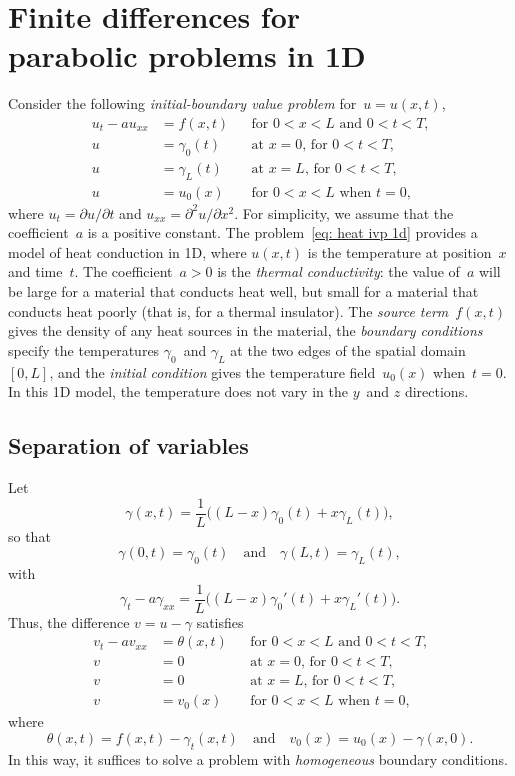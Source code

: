 \chapter[Finite differences for parabolic problems]{Finite differences for \\
parabolic problems in 1D}
Consider the following \emph{initial-boundary value problem} for~$u=u(x,t)$,
\begin{equation}\label{eq: heat ivp 1d}
\begin{aligned}
u_t-au_{xx}&=f(x,t)&&\text{for $0<x<L$ and $0<t<T$,}\\
u&=\gamma_0(t)&&\text{at $x=0$, for $0<t<T$,}\\
u&=\gamma_L(t)&&\text{at $x=L$, for $0<t<T$,}\\
u&=u_0(x)&&\text{for $0<x<L$ when $t=0$,}
\end{aligned}
\end{equation}
where $u_t=\partial u/\partial t$ and $u_{xx}=\partial^2u/\partial x^2$.  For 
simplicity, we assume that the coefficient~$a$ is a positive constant.  The 
problem~\eqref{eq: heat ivp 1d} provides a model of heat conduction in 1D, 
where $u(x,t)$ is the temperature at position~$x$ and time~$t$.  The 
coefficient~$a>0$ is the \emph{thermal conductivity}: the value of~$a$ will be 
large for a material that conducts heat well, but small for a 
material that conducts heat poorly (that is, for a thermal insulator).  The 
\emph{source term}~$f(x,t)$ gives the density of any heat sources in the 
material, the \emph{boundary conditions} specify the temperatures $\gamma_0$~and 
$\gamma_L$ at the two edges of the spatial domain~$[0,L]$, and the 
\emph{initial condition} gives the temperature field~$u_0(x)$ when~$t=0$.  In 
this 1D model, the temperature does not vary in the $y$~and $z$ directions.

\section{Separation of variables}\label{sec: separation}

Let
\begin{equation}\label{eq: gamma(x,t)}
\gamma(x,t)=\frac{1}{L}\bigl((L-x)\gamma_0(t)+x\gamma_L(t)\bigr),
\end{equation}
so that
\[
\gamma(0,t)=\gamma_0(t)\quad\text{and}\quad\gamma(L,t)=\gamma_L(t),
\]
with
\[
\gamma_t-a\gamma_{xx}=\frac{1}{L}\bigl((L-x)\gamma_0'(t)+x\gamma_L'(t)\bigr).
\]
Thus, the difference $v=u-\gamma$ satisfies 
\begin{equation}\label{eq: heat ivp homog 1d}
\begin{aligned}
v_t-av_{xx}&=\theta(x,t)&&\text{for $0<x<L$ and $0<t<T$,}\\
v&=0&&\text{at $x=0$, for $0<t<T$,}\\
v&=0&&\text{at $x=L$, for $0<t<T$,}\\
v&=v_0(x)&&\text{for $0<x<L$ when $t=0$,}
\end{aligned}
\end{equation}
where 
\[
\theta(x,t)=f(x,t)-\gamma_t(x,t)
\quad\text{and}\quad
v_0(x)=u_0(x)-\gamma(x,0).
\]
In this way, it suffices to solve a problem with \emph{homogeneous} boundary 
conditions.


